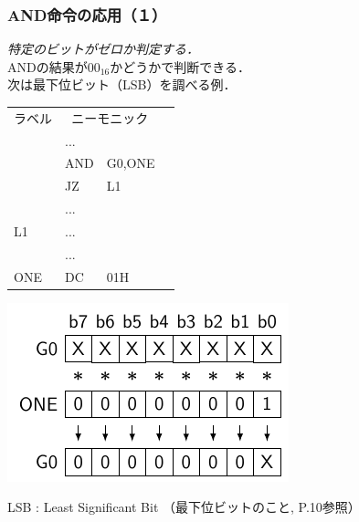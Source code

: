 \documentclass{beamer}                 %
\begin{document}
\begin{frame}
  \frametitle{AND命令の応用（１）}
  \emph{特定のビットがゼロか判定する．} \\
  ANDの結果が$00_{16}$かどうかで判断できる．\\
  次は最下位ビット（LSB）を調べる例．\\
  \vfill
  \begin{minipage}{0.48\columnwidth}
    {\small\ttfamily\begin{center}
      \begin{tabular}{|l|l l|l}
        \cline{1-3}
        ラベル & \multicolumn{2}{|c|}{ニーモニック} & \\
        \cline{1-3}
        & ...  &        & \\
        & AND  & G0,ONE & \\
        & JZ   & L1     & \\
        & ...  &        & \\
        L1  & ...  &        & \\
        & ...  &        & \\
        ONE & DC   & 01H    & \\
        \cline{1-3}
      \end{tabular}
    \end{center}}
  \end{minipage}
  \begin{minipage}{0.48\columnwidth}
    \centerline{\includegraphics[scale=0.8]{../Tikz/land3.pdf}}
  \end{minipage}
  \vfill
  LSB : Least Significant Bit （最下位ビットのこと, P.10参照）
  \vfill
\end{frame}
\end{document}
